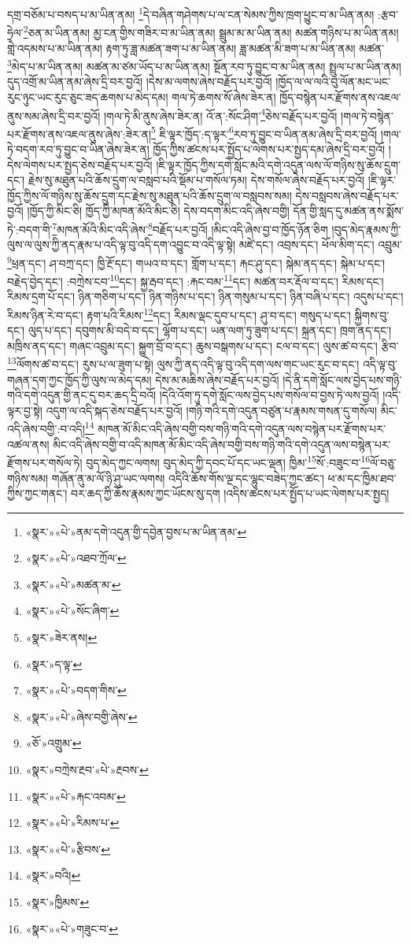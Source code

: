 དགྲ་བཅོམ་པ་བསད་པ་མ་ཡིན་ནམ། \footnote{«སྣར་»«པེ་»ནམ་དགེ་འདུན་གྱི་དབྱེན་བྱས་པ་མ་ཡིན་ནམ་}དེ་བཞིན་གཤེགས་པ་ལ་ངན་སེམས་ཀྱིས་ཁྲག་ཕྱུང་བ་མ་ཡིན་ནམ། :རྩབ་ཧྲེལ་\footnote{«སྣར་»«པེ་»འཐབ་ཀྲོལ་}ཅན་མ་ཡིན་ནམ། མྱ་ངན་གྱིས་གཟིར་བ་མ་ཡིན་ནམ། སྦྲུམ་མ་མ་ཡིན་ནམ། མཚན་གཉིས་པ་མ་ཡིན་ནམ། གླེ་འདམས་པ་མ་ཡིན་ནམ། རྟག་ཏུ་ཟླ་མཚན་ཟག་པ་མ་ཡིན་ནམ། ཟླ་མཚན་མི་ཟག་པ་མ་ཡིན་ནམ། མཚན་\footnote{«སྣར་»«པེ་»མཚན་མ་}མེད་པ་མ་ཡིན་ནམ། མཚན་མ་ཙམ་ཡོད་པ་མ་ཡིན་ནམ། སྔོན་རབ་ཏུ་བྱུང་བ་མ་ཡིན་ནམ། སྤྲུལ་པ་མ་ཡིན་ནམ། དུད་འགྲོ་མ་ཡིན་ནམ་ཞེས་དྲི་བར་བྱའོ། །དེས་མ་ལགས་ཞེས་བརྗོད་པར་བྱའོ། །ཁྱོད་ལ་ལ་ལའི་བུ་ལོན་མང་ཡང་རུང་ཉུང་ཡང་རུང་ཅུང་ཟད་ཆགས་པ་མེད་དམ། གལ་ཏེ་ཆགས་སོ་ཞེས་ཟེར་ན། ཁྱོད་བསྙེན་པར་རྫོགས་ནས་འཇལ་ནུས་སམ་ཞེས་དྲི་བར་བྱའོ། །གལ་ཏེ་མི་ནུས་ཞེས་ཟེར་ན། འོ་ན་:སོང་ཤིག་\footnote{«སྣར་»«པེ་»སོང་ཞིག་}ཅེས་བརྗོད་པར་བྱའོ། །གལ་ཏེ་བསྙེན་པར་རྫོགས་ནས་འཇལ་ནུས་ཞེས་:ཟེར་ན།\footnote{«སྣར་»ཟེར་ནས།} ཇི་ལྟར་ཁྱོད་:ད་ལྟར་\footnote{«སྣར་»ད་ལྟ་}རབ་ཏུ་བྱུང་བ་ཡིན་ནམ་ཞེས་དྲི་བར་བྱའོ། །གལ་ཏེ་བདག་རབ་ཏུ་བྱུང་བ་ཡིན་ཞེས་ཟེར་ན། ཁྱོད་ཀྱིས་ཚངས་པར་སྤྱོད་པ་ལེགས་པར་སྤྱད་དམ་ཞེས་དྲི་བར་བྱའོ། །དེས་ལེགས་པར་སྤྱད་ཅེས་བརྗོད་པར་བྱའོ། །ཇི་ལྟར་ཁྱོད་ཀྱིས་དགེ་སློང་མའི་དགེ་འདུན་ལས་ལོ་གཉིས་སུ་ཆོས་དྲུག་དང་། རྗེས་སུ་མཐུན་པའི་ཆོས་དྲུག་ལ་བསླབ་པའི་སྡོམ་པ་གསོལ་ཏམ། དེས་གསོལ་ཞེས་བརྗོད་པར་བྱའོ། །ཇི་ལྟར་ཁྱོད་ཀྱིས་ལོ་གཉིས་སུ་ཆོས་དྲུག་དང་རྗེས་སུ་མཐུན་པའི་ཆོས་དྲུག་ལ་བསླབས་སམ། དེས་བསླབས་ཞེས་བརྗོད་པར་བྱའོ། །ཁྱོད་ཀྱི་མིང་ཅི། ཁྱོད་ཀྱི་མཁན་མོའི་མིང་ཅི། དེས་བདག་མིང་འདི་ཞེས་བགྱི། དོན་གྱི་སླད་དུ་མཚན་ནས་སྨོས་ཏེ་:བདག་གི་\footnote{«སྣར་»«པེ་»བདག་གིས་}མཁན་མོའི་མིང་འདི་ཞེས་\footnote{«སྣར་»«པེ་»ཞེས་བགྱི་ཞེས་}བརྗོད་པར་བྱའོ། །མིང་འདི་ཞེས་བྱ་བ་ཁྱོད་ཉོན་ཅིག །བུད་མེད་རྣམས་ཀྱི་ལུས་ལ་ལུས་ཀྱི་ནད་རྣམ་པ་འདི་ལྟ་བུ་འདི་དག་འབྱུང་བ་འདི་ལྟ་སྟེ། མཛེ་དང་། འབྲས་དང་། ཕོལ་མིག་དང་། འབྲུམ་\footnote{«ཅོ་»འགྲུམ་}ཕྲན་དང་། ཤ་བཀྲ་དང་། ཁྱི་རྔོ་དང་། གཡའ་བ་དང་། གློག་པ་དང་། རྐང་ཤུ་དང་། སྐེམ་ནད་དང་། སྐེམ་པ་དང་། བརྗེད་བྱེད་དང་། :བཀྲེས་ངབ་\footnote{«སྣར་»བཀྲེས་རྔབ་«པེ་»རྔབས་}དང་། སྐྱ་རྦབ་དང་། :རྐང་བམ་\footnote{«སྣར་»«པེ་»རྐང་འབམ་}དང་། མཚན་བར་རྡོལ་བ་དང་། རིམས་དང་། རིམས་དྲག་པོ་དང་། ཉིན་གཅིག་པ་དང་། ཉིན་གཉིས་པ་དང་། ཉིན་གསུམ་པ་དང་། ཉིན་བཞི་པ་དང་། འདུས་པ་དང་། རིམས་ཉིན་རེ་བ་དང་། རྟག་པའི་རིམས་\footnote{«སྣར་»«པེ་»རིམས་པ་}དང་། རིམས་ལྡང་དུབ་པ་དང་། ཤུ་བ་དང་། གསུད་པ་དང་། སྐྱིགས་བུ་དང་། ལུད་པ་དང་། དབུགས་མི་བདེ་བ་དང་། ལྷོག་པ་དང་། ཡན་ལག་ཏུ་ཟུག་པ་དང་། སྐྲན་དང་། ཁྲག་ནད་དང་། མཁྲིས་ནད་དང་། གཞང་འབྲུམ་དང་། སྐྱུག་བྲོ་བ་དང་། ཆུས་བསྒགས་པ་དང་། ངལ་བ་དང་། ལུས་ཚ་བ་དང་། རྩིབ་\footnote{«སྣར་»«པེ་»རྩིབས་}ལོགས་ཚ་བ་དང་། རུས་པ་ལ་ཟུག་པ་སྟེ། ལུས་ཀྱི་ནད་འདི་ལྟ་བུ་འདི་དག་ལས་གང་ཡང་རུང་བ་དང་། འདི་ལྟ་བུ་གཞན་དག་ཀྱང་ཁྱོད་ཀྱི་ལུས་ལ་མེད་དམ། དེས་མ་མཆིས་ཞེས་བརྗོད་པར་བྱའོ། །དེ་ནི་དགེ་སློང་ལས་བྱེད་པས་གཉི་གའི་དགེ་འདུན་གྱི་ནང་དུ་བར་ཆད་དྲི་བའོ། །དེའི་འོག་ཏུ་དགེ་སློང་ལས་བྱེད་པས་གསོལ་བ་བྱས་ཏེ་ལས་བྱའོ། །འདི་ལྟར་བྱ་སྟེ། འདུག་ལ་འདི་སྐད་ཅེས་བརྗོད་པར་བྱའོ། །གཉི་གའི་དགེ་འདུན་བཙུན་པ་རྣམས་གསན་དུ་གསོལ། མིང་འདི་ཞེས་བགྱི་:བ་འདི།\footnote{«སྣར་»བའི།} མཁན་མོ་མིང་འདི་ཞེས་བགྱི་བས་གཉི་གའི་དགེ་འདུན་ལས་བསྙེན་པར་རྫོགས་པར་འཚལ་ནས། མིང་འདི་ཞེས་བགྱི་བ་འདི་མཁན་མོ་མིང་འདི་ཞེས་བགྱི་བས་གཉི་གའི་དགེ་འདུན་ལས་བསྙེན་པར་རྫོགས་པར་གསོལ་ཏེ། བུད་མེད་ཀྱང་ལགས། བུད་མེད་ཀྱི་དབང་པོ་དང་ཡང་ལྡན། ཁྱིམ་\footnote{«སྣར་»ཁྱིམས་}སོ་:བཟུང་བ་\footnote{«སྣར་»«པེ་»གཟུང་བ་}ལོ་བཅུ་གཉིས་སམ། གཞོན་ནུ་མ་ལོ་ཉི་ཤུ་ཡང་ལགས། འདིའི་ཆོས་གོས་ལྔ་དང་ལྷུང་བཟེད་ཀྱང་ཚང་། ཕ་མ་དང་ཁྱིམ་ཐབ་ཀྱིས་ཀྱང་གནང་། བར་ཆད་ཀྱི་ཆོས་རྣམས་ཀྱང་ཡོངས་སུ་དག །འདིས་ཚངས་པར་སྤྱོད་པ་ཡང་ལེགས་པར་སྤྱད། 